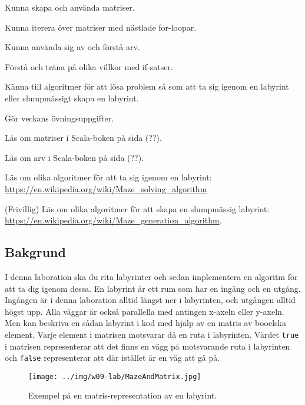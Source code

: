 
\Lab{\LabWeekTEN}

\begin{Goals}
\item Kunna skapa och använda matriser.
\item Kunna iterera över matriser med nästlade for-loopar.
\item Kunna använda sig av och förstå arv.
\item Förstå och träna på olika villkor med if-satser.
\item Känna till algoritmer för att lösa problem så som att ta sig igenom en labyrint eller slumpmässigt skapa en labyrint.
\end{Goals}

\begin{Preparations}
\item Gör veckans övningsuppgifter.
\item Läs om matriser i Scala-boken på sida (??).
\item Läs om arv i Scala-boken på sida (??).
\item Läs om olika algoritmer för att ta sig igenom en labyrint: \url{https://en.wikipedia.org/wiki/Maze\_solving\_algorithm}
\item (Frivillig) Läs om olika algoritmer för att skapa en slumpmässig labyrint: \url{https://en.wikipedia.org/wiki/Maze\_generation\_algorithm}.
\end{Preparations}

\subsection{Bakgrund}

I denna laboration ska du rita labyrinter och sedan implementera en algoritm för att ta dig igenom dessa. En labyrint är ett rum som har en ingång och en utgång. Ingången är i denna laboration alltid längst ner i labyrinten, och utgången alltid högst upp. Alla väggar är också parallella med antingen x-axeln eller y-axeln. Men kan beskriva en sådan labyrint i kod med hjälp av en matris av booelska element. Varje element i matrisen motsvarar då en ruta i labyrinten. Värdet \texttt{true} i matrisen representerar att det finns en vägg på motsvarande ruta i labyrinten och \texttt{false} representerar att där istället är en väg att gå på.

\begin{figure}[h]
	\begin{center}
		\texttt{[image: ../img/w09-lab/MazeAndMatrix.jpg]}
	\end{center}
	\caption{Exempel på en matris-representation av en labyrint.}
\end{figure}

